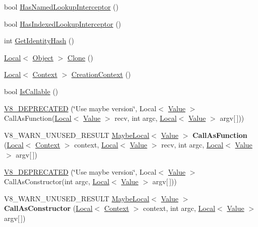 \begin{DoxyCompactItemize}
\item 
bool \hyperlink{classv8_1_1_object_a1e96fcb9ee17101c0299ec68f2cf8610}{Has\+Named\+Lookup\+Interceptor} ()
\item 
bool \hyperlink{classv8_1_1_object_a278913bcd203434870ce5184a538a9af}{Has\+Indexed\+Lookup\+Interceptor} ()
\item 
int \hyperlink{classv8_1_1_object_ac1ece41e81a499920ec3a2a3471653bc}{Get\+Identity\+Hash} ()
\item 
\hyperlink{classv8_1_1_local}{Local}$<$ \hyperlink{classv8_1_1_object}{Object} $>$ \hyperlink{classv8_1_1_object_a5018c9d085aa71f65530cf1e073a04ad}{Clone} ()
\item 
\hyperlink{classv8_1_1_local}{Local}$<$ \hyperlink{classv8_1_1_context}{Context} $>$ \hyperlink{classv8_1_1_object_af6966283a7d7e20779961eed434db04d}{Creation\+Context} ()
\item 
bool \hyperlink{classv8_1_1_object_a23c2c1f23b50fab4a02e2f819641b865}{Is\+Callable} ()
\item 
\hyperlink{classv8_1_1_object_a804b075e3562005ad8d0e2970ce9cf1a}{V8\+\_\+\+D\+E\+P\+R\+E\+C\+A\+T\+ED} (\char`\"{}Use maybe version\char`\"{}, Local$<$ \hyperlink{classv8_1_1_value}{Value} $>$ Call\+As\+Function(\hyperlink{classv8_1_1_local}{Local}$<$ \hyperlink{classv8_1_1_value}{Value} $>$ recv, int argc,                                                                                                                                                                       \hyperlink{classv8_1_1_local}{Local}$<$ \hyperlink{classv8_1_1_value}{Value} $>$ argv\mbox{[}$\,$\mbox{]}))
\item 
V8\+\_\+\+W\+A\+R\+N\+\_\+\+U\+N\+U\+S\+E\+D\+\_\+\+R\+E\+S\+U\+LT \hyperlink{classv8_1_1_maybe_local}{Maybe\+Local}$<$ \hyperlink{classv8_1_1_value}{Value} $>$ {\bfseries Call\+As\+Function} (\hyperlink{classv8_1_1_local}{Local}$<$ \hyperlink{classv8_1_1_context}{Context} $>$ context, \hyperlink{classv8_1_1_local}{Local}$<$ \hyperlink{classv8_1_1_value}{Value} $>$ recv, int argc, \hyperlink{classv8_1_1_local}{Local}$<$ \hyperlink{classv8_1_1_value}{Value} $>$ argv\mbox{[}$\,$\mbox{]})\hypertarget{classv8_1_1_object_aec7375fe34a800baac4e26deb33ccac0}{}\label{classv8_1_1_object_aec7375fe34a800baac4e26deb33ccac0}

\item 
\hyperlink{classv8_1_1_object_a0ce5417b42d5bfb5a8dc3482dcb733eb}{V8\+\_\+\+D\+E\+P\+R\+E\+C\+A\+T\+ED} (\char`\"{}Use maybe version\char`\"{}, Local$<$ \hyperlink{classv8_1_1_value}{Value} $>$ Call\+As\+Constructor(int argc, \hyperlink{classv8_1_1_local}{Local}$<$ \hyperlink{classv8_1_1_value}{Value} $>$ argv\mbox{[}$\,$\mbox{]}))
\item 
V8\+\_\+\+W\+A\+R\+N\+\_\+\+U\+N\+U\+S\+E\+D\+\_\+\+R\+E\+S\+U\+LT \hyperlink{classv8_1_1_maybe_local}{Maybe\+Local}$<$ \hyperlink{classv8_1_1_value}{Value} $>$ {\bfseries Call\+As\+Constructor} (\hyperlink{classv8_1_1_local}{Local}$<$ \hyperlink{classv8_1_1_context}{Context} $>$ context, int argc, \hyperlink{classv8_1_1_local}{Local}$<$ \hyperlink{classv8_1_1_value}{Value} $>$ argv\mbox{[}$\,$\mbox{]})\hypertarget{classv8_1_1_object_a10dcefb0bd595a959234703690a02530}{}\label{classv8_1_1_object_a10dcefb0bd595a959234703690a02530}


\end{DoxyCompactItemize}
